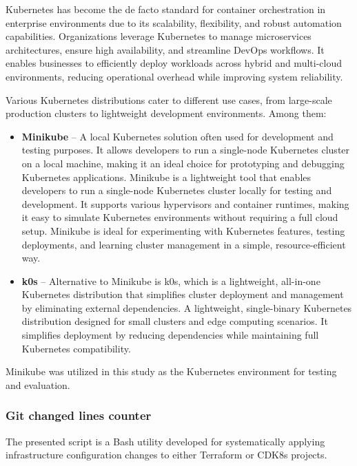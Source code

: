 \documentclass{article}
\begin{document}
Kubernetes has become the de facto standard for container orchestration in enterprise environments due to its scalability, flexibility, and robust automation capabilities. Organizations leverage Kubernetes to manage microservices architectures, ensure high availability, and streamline DevOps workflows. It enables businesses to efficiently deploy workloads across hybrid and multi-cloud environments, reducing operational overhead while improving system reliability. \cite{k8s-5}

Various Kubernetes distributions cater to different use cases, from large-scale production clusters to lightweight development environments. Among them:

\begin{itemize}

\item \textbf{Minikube} – A local Kubernetes solution often used for development and testing purposes. It allows developers to run a single-node Kubernetes cluster on a local machine, making it an ideal choice for prototyping and debugging Kubernetes applications. Minikube is a lightweight tool that enables developers to run a single-node Kubernetes cluster locally for testing and development. It supports various hypervisors and container runtimes, making it easy to simulate Kubernetes environments without requiring a full cloud setup. \cite{k8s-6} Minikube is ideal for experimenting with Kubernetes features, testing deployments, and learning cluster management in a simple, resource-efficient way. \cite{k8s-3}

\item \textbf{k0s} – Alternative to Minikube is k0s, which is a lightweight, all-in-one Kubernetes distribution that simplifies cluster deployment and management by eliminating external dependencies. \cite{k8s-3} A lightweight, single-binary Kubernetes distribution designed for small clusters and edge computing scenarios. It simplifies deployment by reducing dependencies while maintaining full Kubernetes compatibility. \cite{k8s-4}

\end{itemize}

Minikube was utilized in this study as the Kubernetes environment for testing and evaluation.

\subsubsection{Git changed lines counter}
\label{sec:git-changed-lines-coutner}
The presented script is a Bash utility developed for systematically applying infrastructure configuration changes to either Terraform or CDK8s projects. 
\end{document}
